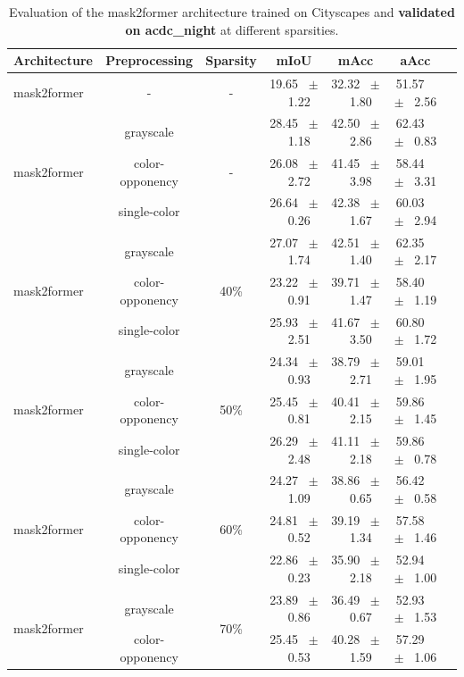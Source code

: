 \begin{table}[h]
  \centering
  \caption{Evaluation of the mask2former architecture trained on Cityscapes and \textbf{validated on acdc_night} at different sparsities.}
  \begin{tabular}{@{}lccc ccc@{}}
    \toprule
    Architecture & Preprocessing & Sparsity & mIoU & mAcc & aAcc \\
    \midrule
    mask2former & - & - & 19.65 ~$\pm$~ 1.22 & 32.32 ~$\pm$~ 1.80 & 51.57 ~$\pm$~ 2.56 \\
    \midrule
    \midrule
    \multirow{3}{*}{mask2former} & grayscale & \multirow{3}{*}{-} & 28.45 ~$\pm$~ 1.18 & 42.50 ~$\pm$~ 2.86 & 62.43 ~$\pm$~ 0.83 \\
    & color-opponency & & 26.08 ~$\pm$~ 2.72 & 41.45 ~$\pm$~ 3.98 & 58.44 ~$\pm$~ 3.31 \\
    & single-color & & 26.64 ~$\pm$~ 0.26 & 42.38 ~$\pm$~ 1.67 & 60.03 ~$\pm$~ 2.94 \\
    \midrule
    \multirow{3}{*}{mask2former} & grayscale & \multirow{3}{*}{40\%} & 27.07 ~$\pm$~ 1.74 & 42.51 ~$\pm$~ 1.40 & 62.35 ~$\pm$~ 2.17 \\
    & color-opponency & & 23.22 ~$\pm$~ 0.91 & 39.71 ~$\pm$~ 1.47 & 58.40 ~$\pm$~ 1.19 \\
    & single-color & & 25.93 ~$\pm$~ 2.51 & 41.67 ~$\pm$~ 3.50 & 60.80 ~$\pm$~ 1.72 \\
    \midrule
    \multirow{3}{*}{mask2former} & grayscale & \multirow{3}{*}{50\%} & 24.34 ~$\pm$~ 0.93 & 38.79 ~$\pm$~ 2.71 & 59.01 ~$\pm$~ 1.95 \\
    & color-opponency & & 25.45 ~$\pm$~ 0.81 & 40.41 ~$\pm$~ 2.15 & 59.86 ~$\pm$~ 1.45 \\
    & single-color & & 26.29 ~$\pm$~ 2.48 & 41.11 ~$\pm$~ 2.18 & 59.86 ~$\pm$~ 0.78 \\
    \midrule
    \multirow{3}{*}{mask2former} & grayscale & \multirow{3}{*}{60\%} & 24.27 ~$\pm$~ 1.09 & 38.86 ~$\pm$~ 0.65 & 56.42 ~$\pm$~ 0.58 \\
    & color-opponency & & 24.81 ~$\pm$~ 0.52 & 39.19 ~$\pm$~ 1.34 & 57.58 ~$\pm$~ 1.46 \\
    & single-color & & 22.86 ~$\pm$~ 0.23 & 35.90 ~$\pm$~ 2.18 & 52.94 ~$\pm$~ 1.00 \\
    \midrule
    \multirow{3}{*}{mask2former} & grayscale & \multirow{3}{*}{70\%} & 23.89 ~$\pm$~ 0.86 & 36.49 ~$\pm$~ 0.67 & 52.93 ~$\pm$~ 1.53 \\
    & color-opponency & & 25.45 ~$\pm$~ 0.53 & 40.28 ~$\pm$~ 1.59 & 57.29 ~$\pm$~ 1.06 \\

\end{tabular}
\end{table}
